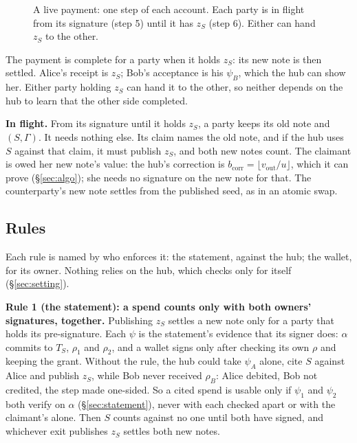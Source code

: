 \documentclass[11pt]{article}
\theoremstyle{plain}
\theoremstyle{definition}
\newcommand{\bcorr}{b_{\mathrm{corr}}}
\newcommand{\Compl}{\mathsf{Complete}}
\newcommand{\vout}{v_{\mathrm{out}}}
\begin{document}
\begin{figure}[!tbp]
\caption{A live payment: one step of each account. Each party is in
flight from its signature (step 5) until it has $z_S$ (step 6). Either
can hand $z_S$ to the other.}
\label{fig:payment}
\end{figure}

The payment is complete for a party when it holds $z_S$: its new note
is then settled. Alice's receipt is $z_S$; Bob's acceptance is his
$\psi_B$, which the hub can show her. Either party holding $z_S$ can
hand it to the other, so neither depends on the hub to learn that the
other side completed.

\textbf{In flight.} From its signature until it holds $z_S$, a party
keeps its old note and $(S, \Gamma)$. It needs nothing else. Its claim
names the old note, and if the hub uses $S$ against that claim, it must
publish $z_S$, and both new notes count. The claimant is owed her new
note's value: the hub's correction is $\bcorr = \lfloor \vout/u
\rfloor$, which it can prove (\S\ref{sec:algo}); she needs no signature
on the new note for that. The counterparty's new note settles from the
published seed, as in an atomic swap.

\subsection{Rules}\label{sec:rules}

Each rule is named by who enforces it: the statement, against the hub;
the wallet, for its owner. Nothing relies on the hub, which checks only
for itself (\S\ref{sec:setting}).

\textbf{Rule 1 (the statement): a spend counts only with both owners'
signatures, together.} Publishing $z_S$ settles a new note only for a
party that holds its pre-signature. Each $\psi$ is the statement's
evidence that its signer does: $\alpha$ commits to $T_S$, $\rho_1$ and
$\rho_2$, and a wallet signs only after checking its own $\rho$ and
keeping the grant. Without the rule, the hub could take $\psi_A$ alone,
cite $S$ against Alice and publish $z_S$, while Bob never received
$\rho_B$: Alice debited, Bob not credited, the step made one-sided. So a
cited spend is usable only if $\psi_1$ and $\psi_2$ both verify on
$\alpha$ (\S\ref{sec:statement}), never with each checked apart or with
the claimant's alone. Then $S$ counts against no one until both have
signed, and whichever exit publishes $z_S$ settles both new notes.
\end{document}
